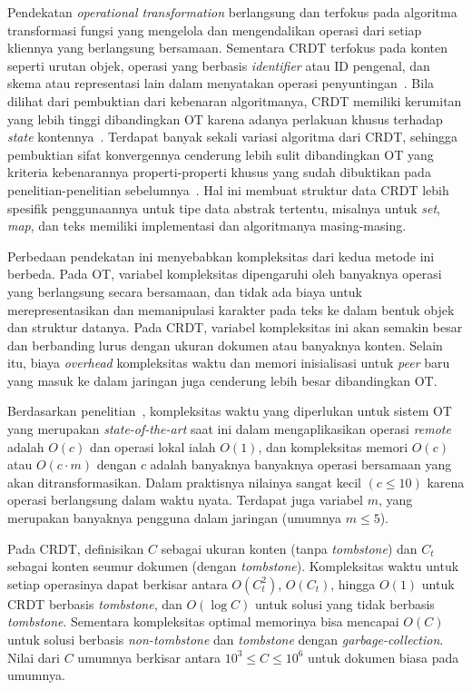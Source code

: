 Pendekatan \textit{operational transformation} berlangsung dan terfokus pada algoritma transformasi fungsi yang mengelola dan mengendalikan operasi dari setiap kliennya yang berlangsung bersamaan. Sementara CRDT terfokus pada konten seperti urutan objek, operasi yang berbasis \textit{identifier} atau ID pengenal, dan skema atau representasi lain dalam menyatakan operasi penyuntingan~\citep{Sun2019Second, Sun2019First}. Bila dilihat dari pembuktian dari kebenaran algoritmanya, CRDT memiliki kerumitan yang lebih tinggi dibandingkan OT karena adanya perlakuan khusus terhadap \textit{state} kontennya~\citep{Sun2019Second}. Terdapat banyak sekali variasi algoritma dari CRDT, sehingga pembuktian sifat konvergennya cenderung lebih sulit dibandingkan OT yang kriteria kebenarannya properti-properti khusus yang sudah dibuktikan pada penelitian-penelitian sebelumnya~\citep{OTOverview1, Sun2004, oster2005real}. Hal ini membuat struktur data CRDT lebih spesifik penggunaannya untuk tipe data abstrak tertentu, misalnya untuk \textit{set}, \textit{map}, dan teks memiliki implementasi dan algoritmanya masing-masing.

Perbedaan pendekatan ini menyebabkan kompleksitas dari kedua metode ini berbeda. Pada OT, variabel kompleksitas dipengaruhi oleh banyaknya operasi yang berlangsung secara bersamaan, dan tidak ada biaya untuk merepresentasikan dan memanipulasi karakter pada teks ke dalam bentuk objek dan struktur datanya. Pada CRDT, variabel kompleksitas ini akan semakin besar dan berbanding lurus dengan ukuran dokumen atau banyaknya konten. Selain itu, biaya \textit{overhead} kompleksitas waktu dan memori inisialisasi untuk \textit{peer} baru yang masuk ke dalam jaringan juga cenderung lebih besar dibandingkan OT.

Berdasarkan penelitian~\cite{Sun2019Second}, kompleksitas waktu yang diperlukan untuk sistem OT yang merupakan \textit{state-of-the-art} saat ini dalam mengaplikasikan operasi \textit{remote} adalah $O(c)$ dan operasi lokal ialah $O(1)$, dan kompleksitas memori $O(c)$ atau $O(c \cdot m)$ dengan $c$ adalah banyaknya banyaknya operasi bersamaan yang akan ditransformasikan. Dalam praktisnya nilainya sangat kecil $(c \leq 10)$ karena operasi berlangsung dalam waktu nyata. Terdapat juga variabel $m$, yang merupakan banyaknya pengguna dalam jaringan (umumnya $m \leq 5$).

Pada CRDT, definisikan $C$ sebagai ukuran konten (tanpa \textit{tombstone}) dan $C_t$ sebagai konten seumur dokumen (dengan \textit{tombstone}). Kompleksitas waktu untuk setiap operasinya dapat berkisar antara $O(C_{t}^{2})$, $O(C_{t})$, hingga $O(1)$ untuk CRDT berbasis \textit{tombstone}, dan $O(\log C)$ untuk solusi yang tidak berbasis \textit{tombstone}. Sementara kompleksitas optimal memorinya bisa mencapai $O(C)$ untuk solusi berbasis \textit{non-tombstone} dan \textit{tombstone} dengan \textit{garbage-collection}. Nilai dari $C$ umumnya berkisar antara $10^3 \leq C \leq 10^6$ untuk dokumen biasa pada umumnya.

